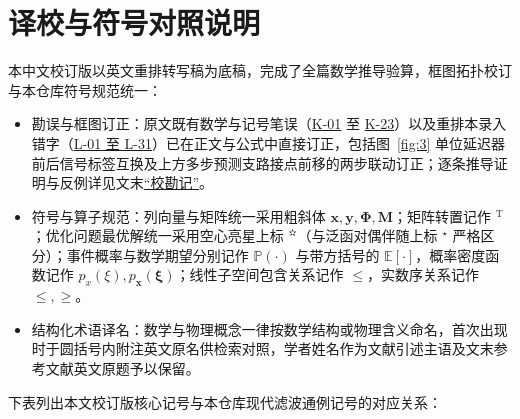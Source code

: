 \section*{译校与符号对照说明}

本中文校订版以英文重排转写稿为底稿，完成了全篇数学推导验算，框图拓扑校订与本仓库符号规范统一：

\begin{itemize}
\item 勘误与框图订正：原文既有数学与记号笔误（\hyperref[sec:k01]{K-01} 至 \hyperref[sec:k23]{K-23}）以及重排本录入错字（\hyperref[sec:l-all]{L-01 至 L-31}）已在正文与公式中直接订正，包括图~\ref{fig:3} 单位延迟器前后信号标签互换及上方多步预测支路接点前移的两步联动订正；逐条推导证明与反例详见文末\hyperref[sec:errata]{“校勘记”}。
\item 符号与算子规范：列向量与矩阵统一采用粗斜体 $\bm{x}, \bm{y}, \bm{\Phi}, \bm{M}$；矩阵转置记作 ${}^{\mathrm{T}}$；优化问题最优解统一采用空心亮星上标 ${}^{\text{✫}}$（与泛函对偶伴随上标 ${}^{\star}$ 严格区分）；事件概率与数学期望分别记作 $\mathbb{P}(\cdot)$ 与带方括号的 $\mathbb{E}[\cdot]$，概率密度函数记作 $p_x(\xi), p_{\bm{x}}(\bm{\xi})$；线性子空间包含关系记作 $\leqslant$，实数序关系记作 $\leq, \geq$。
\item 结构化术语译名：数学与物理概念一律按数学结构或物理含义命名，首次出现时于圆括号内附注英文原名供检索对照，学者姓名作为文献引述主语及文末参考文献英文原题予以保留。
\end{itemize}

下表列出本文校订版核心记号与本仓库现代滤波通例记号的对应关系：

